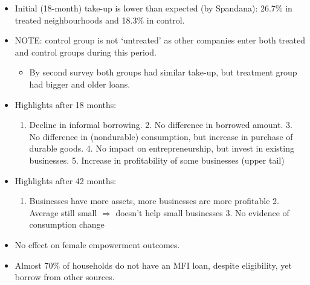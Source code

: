 \documentclass[
  letterpaper,
  DIV=11,
  numbers=noendperiod]{scrreprt}
\providecommand{\tightlist}{%
  \setlength{\itemsep}{0pt}\setlength{\parskip}{0pt}}\usepackage{longtable,booktabs,array}
\theoremstyle{definition}
\theoremstyle{remark}
\begin{document}
\begin{itemize}
\tightlist
\item
  Initial (18-month) take-up is lower than expected (by Spandana):
  26.7\% in treated neighbourhoods and 18.3\% in control.
\item
  NOTE: control group is not `untreated' as other companies enter both
  treated and control groups during this period.

  \par

  \begin{itemize}
  \tightlist
  \item
    By second survey both groups had similar take-up, but treatment
    group had bigger and older loans.
  \end{itemize}
\item
  Highlights after 18 months:

  \par

  \begin{enumerate}
  \def\labelenumi{\arabic{enumi}.}
  \tightlist
  \item
    Decline in informal borrowing. 2. No difference in borrowed amount.
    3. No difference in (nondurable) consumption, but increase in
    purchase of durable goods. 4. No impact on entrepreneurship, but
    invest in existing businesses. 5. Increase in profitability of some
    businesses (upper tail)
  \end{enumerate}
\item
  Highlights after 42 months:

  \par

  \begin{enumerate}
  \def\labelenumi{\arabic{enumi}.}
  \tightlist
  \item
    Businesses have more assets, more businesses are more profitable 2.
    Average still small \(\Rightarrow\) doesn't help small businesses 3.
    No evidence of consumption change
  \end{enumerate}
\item
  No effect on female empowerment outcomes.
\item
  Almost 70\% of households do not have an MFI loan, despite
  eligibility, yet borrow from other sources.
\end{itemize}
\end{document}

